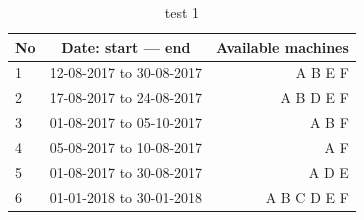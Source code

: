 \begin{table}[h!]
  \centering
  \label{tab:table1}
  \begin{tabular}{l|c||r}
    No & Date: start --- end & Available machines\\
    \hline
    1 &12-08-2017 to 30-08-2017  & A B E F \\
    2 &17-08-2017 to 24-08-2017  & A B D E F\\
    3 &01-08-2017 to 05-10-2017  & A B F \\
    4 &05-08-2017 to 10-08-2017  & A F \\
    5 &01-08-2017 to 30-08-2017  & A D E  \\
    6 &01-01-2018 to 30-01-2018  & A B C D E F \\
  \end{tabular}
  \caption{test 1}
\end{table}

